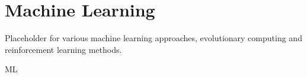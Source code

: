 \hypertarget{Chap:Learning}{%
\section{Machine Learning}\label{Chap:Learning}}

Placeholder for various machine learning approaches, evolutionary
computing and reinforcement learning methods.

ML

